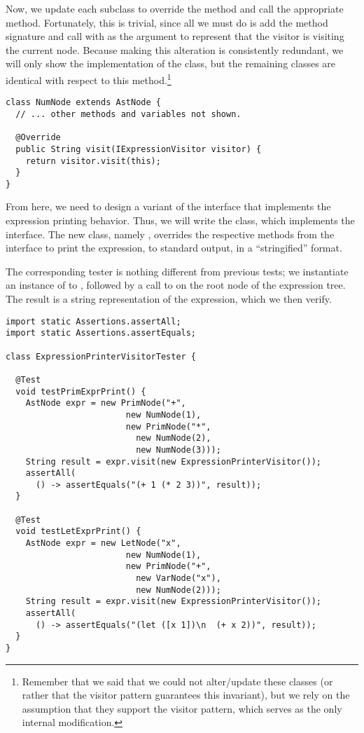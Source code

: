 Now, we update each subclass to override the  method and call the appropriate  method. 
Fortunately, this is trivial, since all we must do is add the method signature and call  with  as the argument to represent that the visitor is visiting the current node. 
Because making this alteration is consistently redundant, we will only show the implementation of the  class, but the remaining classes are identical with respect to this method.\footnote{Remember that we said that we could not alter/update these classes (or rather that the visitor pattern guarantees this invariant), but we rely on the assumption that they support the visitor pattern, which serves as the only internal modification.}

\begin{lstlisting}[language=MyJava]
class NumNode extends AstNode {
  // ... other methods and variables not shown.

  @Override
  public String visit(IExpressionVisitor visitor) {
    return visitor.visit(this);
  }
}
\end{lstlisting}

From here, we need to design a variant of the interface that implements the expression printing behavior. 
Thus, we will write the  class, which implements the  interface. 
The new class, namely , overrides the respective methods from the  interface to print the expression, to standard output, in a ``stringified'' format.

The corresponding tester is nothing different from previous tests; we instantiate an instance of  to , followed by a call to  on the root node of the expression tree. 
The result is a string representation of the expression, which we then verify.

\begin{lstlisting}[language=MyJava]
import static Assertions.assertAll;
import static Assertions.assertEquals;

class ExpressionPrinterVisitorTester {

  @Test
  void testPrimExprPrint() {
    AstNode expr = new PrimNode("+", 
                        new NumNode(1), 
                        new PrimNode("*", 
                          new NumNode(2), 
                          new NumNode(3)));
    String result = expr.visit(new ExpressionPrinterVisitor());
    assertAll(
      () -> assertEquals("(+ 1 (* 2 3))", result));
  }

  @Test
  void testLetExprPrint() {
    AstNode expr = new LetNode("x", 
                        new NumNode(1), 
                        new PrimNode("+", 
                          new VarNode("x"), 
                          new NumNode(2)));
    String result = expr.visit(new ExpressionPrinterVisitor());
    assertAll(
      () -> assertEquals("(let ([x 1])\n  (+ x 2))", result));
  }
}
\end{lstlisting}

